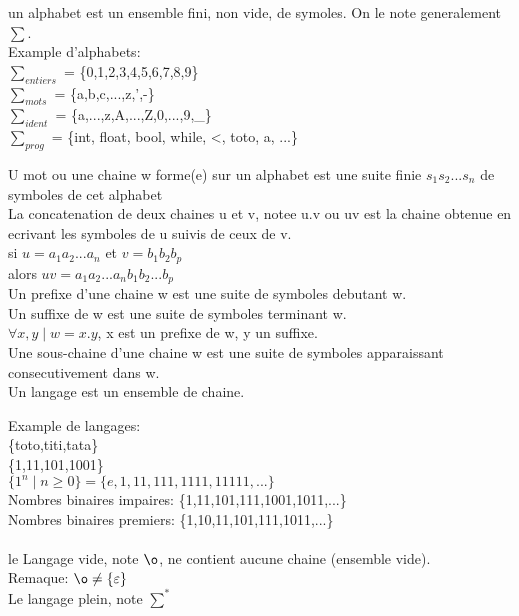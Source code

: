\documentclass{article}
\begin{document}
un alphabet est un ensemble fini, non vide, de symoles. On le note generalement $\sum$.\\
Example d'alphabets:\\
$\sum_{entiers}$ = \{0,1,2,3,4,5,6,7,8,9\}\\
$\sum_{mots}$ = \{a,b,c,...,z,',-\}\\
$\sum_{ident}$ = \{a,...,z,A,...,Z,0,...,9,\_\}\\
$\sum_{prog}$ = \{int, float, bool, while, <, toto, a, ...\}

U mot ou une chaine w forme(e) sur un alphabet est une suite finie $s_1 s_2 ... s_n$ de symboles de cet alphabet\\


La concatenation de deux chaines u et v, notee u.v ou uv est la chaine obtenue en ecrivant les symboles de u suivis de ceux de v.\\
si $u=a_1 a_2 ... a_n$ et $v=b_1 b_2 b_p$\\
alors $uv=a_1 a_2 ... a_n b_1 b_2 ... b_p$\\

Un prefixe d'une chaine w est une suite de symboles debutant w.\\
Un suffixe de w est une suite de symboles terminant w.\\
$\forall x,y \mid w=x.y$, x est un prefixe de w, y un suffixe.\\

Une sous-chaine d'une chaine w est une suite de symboles apparaissant consecutivement dans w.\\

Un langage est un ensemble de chaine.

Example de langages:\\
\{toto,titi,tata\}\\
\{1,11,101,1001\}\\
$\{1^n \mid n \geq 0\} = \{e,1,11,111,1111,11111,...\}$\\
Nombres binaires impaires: \{1,11,101,111,1001,1011,...\}\\
Nombres binaires premiers: \{1,10,11,101,111,1011,...\}\\
\\
le Langage vide, note $\o$, ne contient aucune chaine (ensemble vide).\\

Remaque: $\o \ne \{\varepsilon\}$\\
Le langage plein, note $\sum^*$\\
\end{document}
